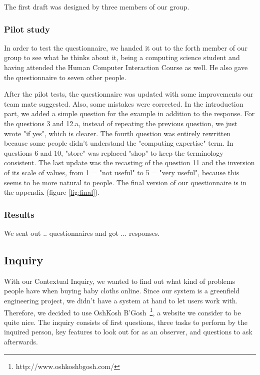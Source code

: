 The first draft was designed by three members of our group.

\subsubsection{Pilot study}
In order to test the questionnaire, we handed it out to the forth member of our group to see what he thinks about it, being a computing science student and having attended the Human Computer Interaction Course as well. He also gave the questionnaire to seven other people.

After the pilot tests, the questionnaire was updated with some improvements our team mate suggested. Also, some mistakes were corrected. In the introduction part, we added a simple question for the example in addition to the response. For the questions 3 and 12.a, instead of repeating the previous question, we just wrote "if yes", which is clearer. The fourth question was entirely rewritten because some people didn't understand the "computing expertise" term. In questions 6 and 10, "store" was replaced "shop" to keep the terminology consistent. The last update was the recasting of the question 11 and the inversion of its scale of values, from 1 = "not useful" to 5 = "very useful", because this seems to be more natural to people. The final version of our questionnaire is in the appendix (figure \ref{fig:final}).

\subsubsection{Results}
We sent out .. questionnaires and got ... responses.


\subsection{Inquiry}
With our Contextual Inquiry, we wanted to find out what kind of problems people have when buying baby cloths online. Since our system is a greenfield engineering project, we didn't have a system at hand to let users work with. Therefore, we decided to use OshKosh B'Gosh~\footnote{http://www.oshkoshbgosh.com/}, a website we consider to be quite nice.
The inquiry consists of first questions, three tasks to perform by the inquired person, key features to look out for as an observer, and questions to ask afterwards.

